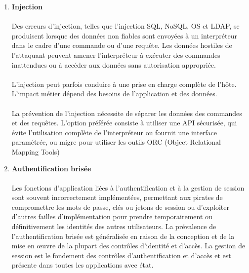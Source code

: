   \begin{enumerate}
	\vspace*{0.8cm} \item \textbf{Injection} \vspace*{-0.4cm}
	\paragraph{}
	Des erreurs d'injection, telles que l'injection SQL, NoSQL, OS et LDAP, se produisent lorsque des données non fiables sont envoyées à un interpréteur dans le cadre d'une commande ou d'une requête. Les données hostiles de l'attaquant peuvent amener l'interpréteur à exécuter des commandes inattendues ou à accéder aux données sans autorisation appropriée.
	\paragraph{}L'injection peut parfois conduire à une prise en charge complète de l'hôte. L'impact métier dépend des besoins de l'application et des données.
	\paragraph{}La prévention de l'injection nécessite de séparer les données des commandes et des requêtes. L'option préférée consiste à utiliser une API sécurisée, qui évite l'utilisation complète de l'interpréteur ou fournit une interface paramétrée, ou migre pour utiliser les outils ORC (Object Relational Mapping Tools)

	\vspace*{0.8cm} \item \textbf{Authentification brisée} \vspace*{-0.4cm}
	\paragraph{}
	Les fonctions d'application liées à l'authentification et à la gestion de session sont souvent incorrectement implémentées, permettant aux pirates de compromettre les mots de passe, clés ou jetons de session ou d'exploiter d'autres failles d'implémentation pour prendre temporairement ou définitivement les identités des autres utilisateurs.
	La prévalence de l'authentification brisée est généralisée en raison de la conception et de la mise en œuvre de la plupart des contrôles d'identité et d'accès. La gestion de session est le fondement des contrôles d'authentification et d'accès et est présente dans toutes les applications avec état.

\end{enumerate}
